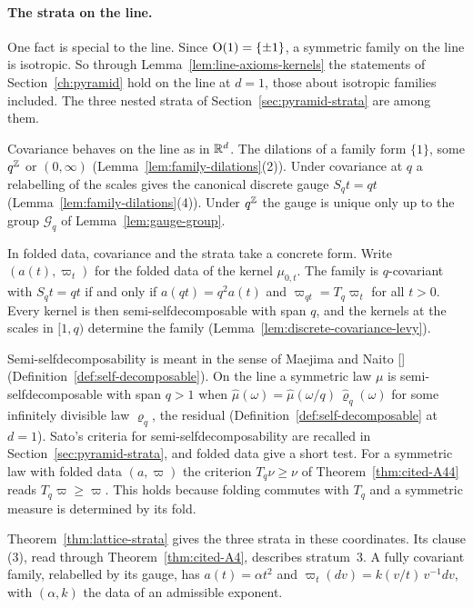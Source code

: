 \paragraph{The strata on the line.} One fact is special to the line. Since
$\mathrm{O}(1) = \{\pm1\}$, a symmetric family on the line is isotropic. So through
Lemma~\ref{lem:line-axioms-kernels} the statements of Section~\ref{ch:pyramid} hold on the line at
$d = 1$, those about isotropic families included. The three nested strata of
Section~\ref{sec:pyramid-strata} are among them.

Covariance behaves on the line as in $\mathbb{R}^d$. The dilations of a family form $\{1\}$, some
$q^{\mathbb{Z}}$ or $(0,\infty)$ (Lemma~\ref{lem:family-dilations}(2)). Under covariance at $q$ a
relabelling of the scales gives the canonical discrete gauge $S_qt = qt$
(Lemma~\ref{lem:family-dilations}(4)). Under $q^{\mathbb{Z}}$ the gauge is unique only up to the group
$\mathcal{G}_q$ of Lemma~\ref{lem:gauge-group}.

In folded data, covariance and the strata take a concrete form. Write $(a(t), \varpi_t)$ for the
folded data of the kernel $\mu_{0,t}$. The family is $q$-covariant with $S_qt = qt$ if and only if
$a(qt) = q^2a(t)$ and $\varpi_{qt} = T_q\varpi_t$ for all $t > 0$. Every kernel is then
semi-selfdecomposable with span $q$, and the kernels at the scales in $[1, q)$ determine the family
(Lemma~\ref{lem:discrete-covariance-levy}).

Semi-selfdecomposability is meant in the sense of Maejima and Naito []
(Definition~\ref{def:self-decomposable}). On the line a symmetric law $\mu$ is
semi-selfdecomposable with span $q > 1$ when
$\widehat\mu(\omega) = \widehat\mu(\omega/q)\,\widehat\varrho_q(\omega)$ for some infinitely
divisible law $\varrho_q$, the residual (Definition~\ref{def:self-decomposable} at $d = 1$). Sato's
criteria for semi-selfdecomposability are recalled in Section~\ref{sec:pyramid-strata}, and folded
data give a short test. For a symmetric law with folded data $(a, \varpi)$ the criterion
$T_q\nu \ge \nu$ of Theorem~\ref{thm:cited-A44} reads $T_q\varpi \ge \varpi$. This holds because
folding commutes with $T_q$ and a symmetric measure is determined by its fold.

Theorem~\ref{thm:lattice-strata} gives the three strata in these coordinates. Its clause (3), read
through Theorem~\ref{thm:cited-A4}, describes stratum~3. A fully covariant family, relabelled by
its gauge, has $a(t) = \alpha t^2$ and $\varpi_t(dv) = k(v/t)\,v^{-1}dv$, with $(\alpha, k)$ the
data of an admissible exponent.

